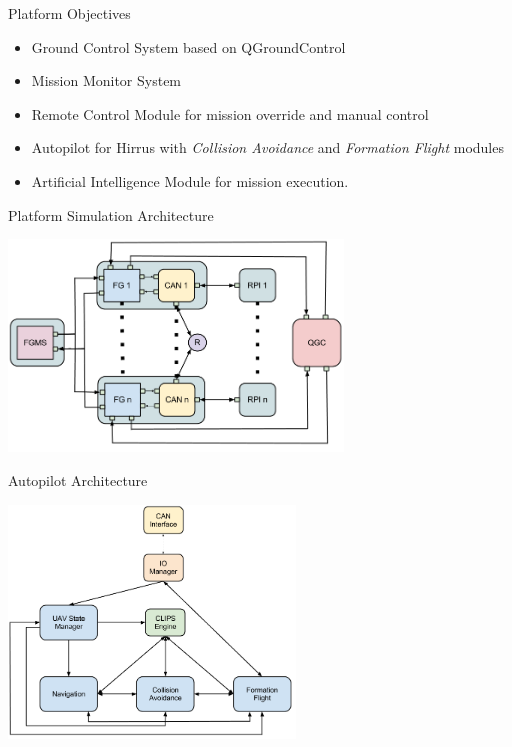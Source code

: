 \documentclass{beamer}
\begin{document}
\begin{frame}{Platform Objectives}
\begin{itemize}
\item Ground Control System based on QGroundControl
\item Mission Monitor System
\item Remote Control Module for mission override and manual control
\item Autopilot for Hirrus with \textit{Collision Avoidance} and \textit{Formation
  Flight} modules
\item Artificial Intelligence Module for mission execution. 
\end{itemize}
\end{frame}

\begin{frame}{Platform Simulation Architecture}
\begin{center}
\includegraphics[width=3.5in]{img/platform-architecture.png}
\end{center}
\end{frame}
\begin{frame}{Autopilot Architecture}
\begin{center}
\includegraphics[width=3in]{img/rpi-architecture.png}
\end{center}
\end{frame}
\end{document}
